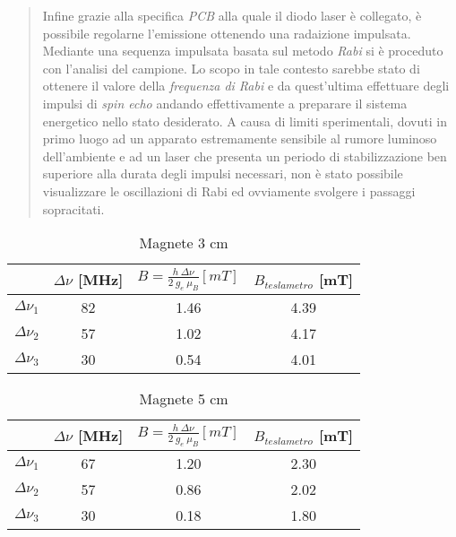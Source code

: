 \documentclass{report}
\begin{document}
\begin{abstract}
  Infine grazie alla specifica \textit{PCB} alla quale il diodo laser è collegato, è possibile regolarne l'emissione ottenendo una radaizione impulsata. Mediante una sequenza impulsata basata sul metodo \textit{Rabi} si è proceduto con l'analisi del campione. Lo scopo in tale contesto sarebbe stato di ottenere il valore della \textit{frequenza di Rabi} e da quest'ultima effettuare degli impulsi di \textit{spin echo} andando effettivamente a preparare il sistema energetico nello stato desiderato. A causa di limiti sperimentali, dovuti in primo luogo ad un apparato estremamente sensibile al rumore luminoso dell'ambiente e ad un laser che presenta un periodo di stabilizzazione ben superiore alla durata degli impulsi necessari, non è stato possibile visualizzare le oscillazioni di Rabi ed ovviamente svolgere i passaggi sopracitati. 


\end{abstract}
\begin{table}[]
    \centering
    \begin{tabular}{c|c|c|c}
        &    $\Delta{\nu}$ [MHz] &   $B =\frac{ h \ \Delta{\nu}}{2 \ g_e \ \mu_B} [mT]$ &   $B_{teslametro}$ [mT]   \\ \hline
    $\Delta{\nu}_1$   &   82  &   1.46    & 4.39  \\ 
    $\Delta{\nu}_2$   &   57  &   1.02    & 4.17  \\
    $\Delta{\nu}_3$   &   30  &   0.54    & 4.01  \\
    \end{tabular}
    \caption{Magnete 3 cm}
    \label{tab:my_label}
\end{table}

\begin{table}[]
    \centering
    \begin{tabular}{c|c|c|c}
        &    $\Delta{\nu}$ [MHz] &   $B =\frac{ h \ \Delta{\nu}}{2 \ g_e \ \mu_B} [mT]$ &   $B_{teslametro}$ [mT]   \\ \hline
    $\Delta{\nu}_1$   &   67  &   1.20    & 2.30  \\ 
    $\Delta{\nu}_2$   &   57  &   0.86    & 2.02  \\
    $\Delta{\nu}_3$   &   30  &   0.18    & 1.80  \\
    \end{tabular}
    \caption{Magnete 5 cm}
    \label{tab:my_label}
\end{table}
\end{document}
